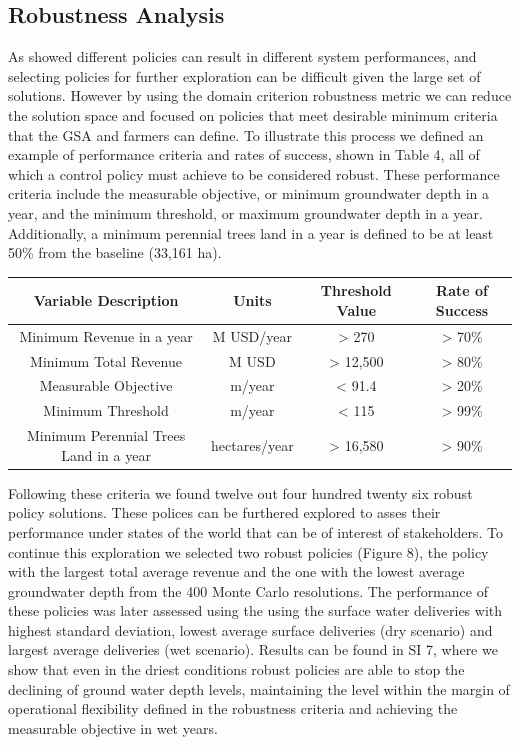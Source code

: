 \documentclass[11pt,a4paper]{article}
\begin{document}
\subsection{Robustness Analysis}

As showed different policies can result in different system performances, and selecting policies for further exploration can be difficult given the large set of solutions. However by using the domain criterion robustness metric we can reduce the solution space and focused on policies that meet desirable minimum criteria that the GSA and farmers can define. To illustrate this process we defined an example of performance criteria and rates of success, shown in Table 4, all of which a control policy must achieve to be considered robust. These performance criteria include the measurable objective, or minimum groundwater depth in a year, and the minimum threshold, or maximum groundwater depth in a year. Additionally, a minimum perennial trees land in a year is defined to be at least 50\% from the baseline (33,161 ha). 

\begin{center}
\begin{tabular}{ |c|c|c|c| }
 \hline
 Variable Description & Units & Threshold Value & Rate of Success \\ 
 \hline
Minimum Revenue in a year  & M USD/year  & > 270 & > 70\% \\
Minimum Total Revenue  & M USD  & > 12,500 & > 80\% \\
Measurable Objective & m/year  & < 91.4 & > 20\%  \\
Minimum Threshold & m/year  & < 115 & > 99\%  \\
Minimum Perennial Trees Land in a year & hectares/year & > 16,580 & > 90\%  \\
\hline
\end{tabular}
\end{center}

Following these criteria we found twelve out four hundred twenty six robust policy solutions. These polices can be furthered explored to asses their performance under states of the world that can be of interest of stakeholders. To continue this exploration we selected two robust policies (Figure 8), the policy with the largest total average revenue and the one with the lowest average groundwater depth from the 400 Monte Carlo resolutions.
The performance of these policies was later assessed using the using the surface water deliveries with highest standard deviation, lowest average surface deliveries (dry scenario) and largest average deliveries (wet scenario). Results can be found in SI 7, where we show that even in the driest conditions robust policies are able to stop the declining of ground water depth levels, maintaining the level within the margin of operational flexibility defined in the robustness criteria and achieving the measurable objective in wet years. 
\end{document}
